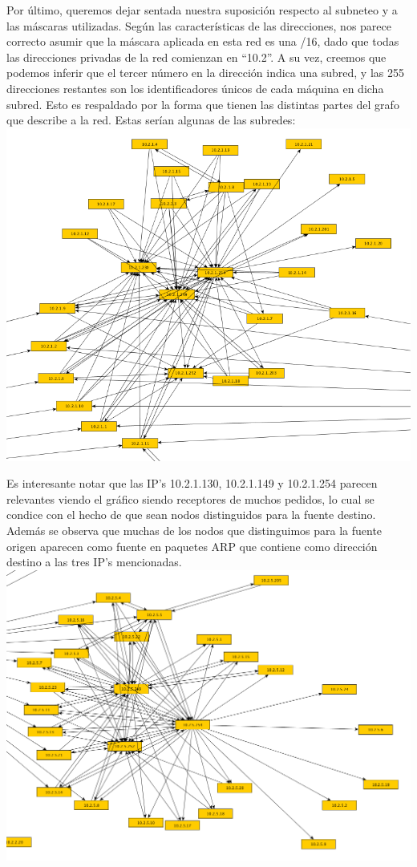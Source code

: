 \newpage
\indent Por último, queremos dejar sentada nuestra suposición respecto al subneteo y a las máscaras utilizadas. Según las características de las direcciones, nos parece correcto asumir que la máscara aplicada en esta red es una /16, dado que todas las direcciones privadas de la red comienzan en ``10.2''. A su vez, creemos que podemos inferir que el tercer número en la dirección indica una subred, y las 255 direcciones restantes son los identificadores únicos de cada máquina en dicha subred. Esto es respaldado por la forma que tienen las distintas partes del grafo que describe a la red. Estas serían algunas de las subredes:\\

\includegraphics[scale=0.5,clip=true,trim=140 0 0 0]{graphics/subnet_1.png}

\indent Es interesante notar que las IP's 10.2.1.130, 10.2.1.149 y 10.2.1.254 parecen relevantes viendo el gráfico siendo receptores de muchos pedidos, lo cual se condice con el hecho de que sean nodos distinguidos para la fuente destino. Además se observa que muchas de los nodos que distinguimos para la fuente origen aparecen como fuente en paquetes ARP que contiene como dirección destino a las tres IP's mencionadas.\\


\includegraphics[scale=0.5,clip=true,trim=140 0 0 0]{graphics/subnet_5.png}

